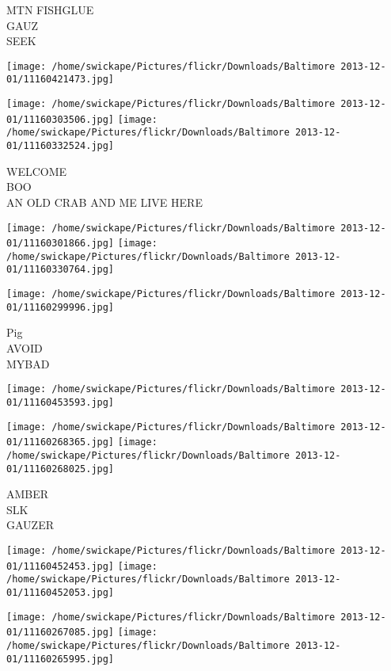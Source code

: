 \documentclass[10pt,letterpaper]{article}
\begin{document}
MTN FISHGLUE\\
GAUZ\\
SEEK\\
\pagebreak

\texttt{[image: /home/swickape/Pictures/flickr/Downloads/Baltimore 2013-12-01/11160421473.jpg]}

\vspace{0.25in}
\texttt{[image: /home/swickape/Pictures/flickr/Downloads/Baltimore 2013-12-01/11160303506.jpg]}
\texttt{[image: /home/swickape/Pictures/flickr/Downloads/Baltimore 2013-12-01/11160332524.jpg]}

WELCOME\\
BOO\\
AN OLD CRAB AND ME LIVE HERE\\
\pagebreak

\texttt{[image: /home/swickape/Pictures/flickr/Downloads/Baltimore 2013-12-01/11160301866.jpg]}
\texttt{[image: /home/swickape/Pictures/flickr/Downloads/Baltimore 2013-12-01/11160330764.jpg]}

\texttt{[image: /home/swickape/Pictures/flickr/Downloads/Baltimore 2013-12-01/11160299996.jpg]}

Pig\\
AVOID\\
MYBAD\\
\pagebreak

\texttt{[image: /home/swickape/Pictures/flickr/Downloads/Baltimore 2013-12-01/11160453593.jpg]}

\vspace{0.25in}
\texttt{[image: /home/swickape/Pictures/flickr/Downloads/Baltimore 2013-12-01/11160268365.jpg]}
\texttt{[image: /home/swickape/Pictures/flickr/Downloads/Baltimore 2013-12-01/11160268025.jpg]}

AMBER\\
SLK\\
GAUZER\\
\pagebreak

\texttt{[image: /home/swickape/Pictures/flickr/Downloads/Baltimore 2013-12-01/11160452453.jpg]}
\texttt{[image: /home/swickape/Pictures/flickr/Downloads/Baltimore 2013-12-01/11160452053.jpg]}

\texttt{[image: /home/swickape/Pictures/flickr/Downloads/Baltimore 2013-12-01/11160267085.jpg]}
\texttt{[image: /home/swickape/Pictures/flickr/Downloads/Baltimore 2013-12-01/11160265995.jpg]}
\end{document}
